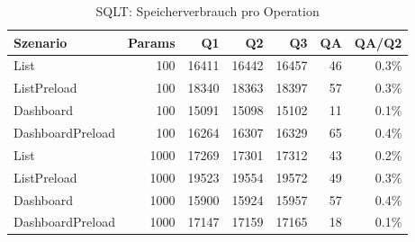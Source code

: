 \begin{table}[ht]
\centering
\caption{SQLT: Speicherverbrauch pro Operation}
\begin{tabular}{lrrrrrr}
\toprule
Szenario & Params & Q1 & Q2 & Q3 & QA & QA/Q2 \\
\midrule
		List & 100 & 16411 & 16442 & 16457 & 46 & 0.3\% \\
		ListPreload & 100 & 18340 & 18363 & 18397 & 57 & 0.3\% \\
		Dashboard & 100 & 15091 & 15098 & 15102 & 11 & 0.1\% \\
		DashboardPreload & 100 & 16264 & 16307 & 16329 & 65 & 0.4\% \\
		List & 1000 & 17269 & 17301 & 17312 & 43 & 0.2\% \\
		ListPreload & 1000 & 19523 & 19554 & 19572 & 49 & 0.3\% \\
		Dashboard & 1000 & 15900 & 15924 & 15957 & 57 & 0.4\% \\
		DashboardPreload & 1000 & 17147 & 17159 & 17165 & 18 & 0.1\% \\
\bottomrule
\end{tabular}
\label{tab:benchmark_sqlt_bytesperop}
\end{table}
	